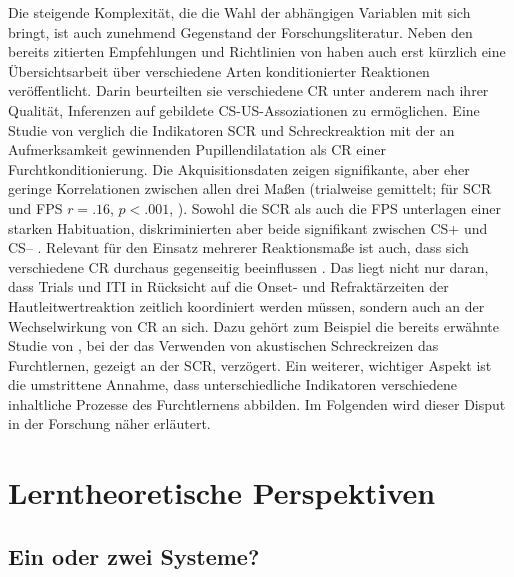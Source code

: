 	Die steigende Komplexität, die die Wahl der abhängigen Variablen mit sich bringt, ist auch zunehmend Gegenstand der Forschungsliteratur. Neben den bereits zitierten Empfehlungen und Richtlinien von \textcite{LONSDORF2017fc} haben auch \textcite{OJALA2020} erst kürzlich eine Übersichtsarbeit über verschiedene Arten konditionierter Reaktionen veröffentlicht. Darin beurteilten sie verschiedene CR unter anderem nach ihrer Qualität, Inferenzen auf gebildete CS-US-Assoziationen zu ermöglichen. Eine Studie von \textcite{LEUCHS2019} verglich die Indikatoren SCR und Schreckreaktion mit der an Aufmerksamkeit gewinnenden Pupillendilatation als CR einer Furchtkonditionierung. Die Akquisitionsdaten zeigen signifikante, aber eher geringe Korrelationen zwischen allen drei Maßen (trialweise gemittelt; für SCR und FPS $r=.16$, $p<.001$, ). Sowohl die SCR als auch die FPS unterlagen einer starken Habituation, diskriminierten aber beide signifikant zwischen CS+ und CS-- \parencite{LEUCHS2019}.
	Relevant für den Einsatz mehrerer Reaktionsmaße ist auch, dass sich verschiedene CR durchaus gegenseitig beeinflussen \parencite{LONSDORF2017fc}. Das liegt nicht nur daran, dass Trials und ITI in Rücksicht auf die Onset- und Refraktärzeiten der Hautleitwertreaktion zeitlich koordiniert werden müssen, sondern auch an der Wechselwirkung von CR an sich. Dazu gehört zum Beispiel die bereits erwähnte Studie von \textcite{SJOUWERMAN2016}, bei der das Verwenden von akustischen Schreckreizen das Furchtlernen, gezeigt an der SCR, verzögert. Ein weiterer, wichtiger Aspekt ist die umstrittene Annahme, dass unterschiedliche Indikatoren verschiedene inhaltliche Prozesse des Furchtlernens abbilden. Im Folgenden wird dieser Disput in der Forschung näher erläutert.


	
\section{Lerntheoretische Perspektiven}			\label{processes}

	\subsection{Ein oder zwei Systeme?}			\label{singledual}

